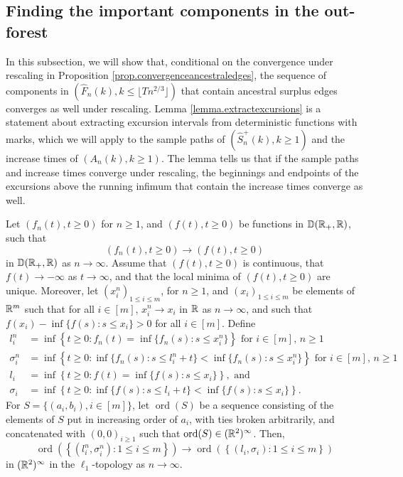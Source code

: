 \subsection{Finding the important components in the out-forest}\label{subsec.componentswithancestral}
In this subsection, we will show that, conditional on the convergence under rescaling in Proposition \ref{prop.convergenceancestraledges}, the sequence of components in $(\hat{F}_n(k),k\leq \lfloor T n^{2/3}\rfloor )$ that contain ancestral surplus edges converges as well under rescaling. Lemma \ref{lemma.extractexcursions} is a statement about extracting excursion intervals from deterministic functions with marks, which we will apply to the sample paths of $(\hat{S}_n^{+}(k),k\geq 1)$ and the increase times of $(A_n(k),k\geq 1)$. The lemma tells us that if the sample paths and increase times converge under rescaling, the beginnings and endpoints of the excursions above the running infimum that contain the increase times converge as well. 
\begin{lemma}\label{lemma.extractexcursions}
Let $(f_n(t), t\geq 0)$ for $n\geq 1$, and $(f(t),t\geq 0)$ be functions in ${\mathbb D}({\mathbb R}_+,{\mathbb R})$, such that 
$$(f_n(t), t\geq 0)\to (f(t),t\geq 0)$$ in ${\mathbb D}({\mathbb R}_+,{\mathbb R})$ as $n\to \infty$. Assume that $(f(t),t\geq 0)$ is continuous, that $f(t)\to -\infty$ as $t\to \infty$, and that the local minima of $(f(t),t\geq 0)$ are unique. Moreover, let $(x_i^n)_{1\leq i\leq m}$, for $n\geq 1$, and $(x_i)_{1\leq i\leq m}$ be elements of ${\mathbb R}^{m}$ such that for all $i\in [m]$, $x_i^n\to x_i$ in ${\mathbb R}$ as $n\to \infty$, and such that $f(x_i)-\inf\{f(s):s\leq x_i\}>0$ for all $i\in [m]$. Define
\begin{align*}l_i^n&=\inf\left\{t\geq 0:f_n(t)=\inf\{f_n(s):s\leq x_i^n\}\right\}\text{ for }i\in [m]\text{, }n\geq 1\\
\sigma_i^n&=\inf\left\{ t\geq 0: \inf\{f_n(s):s\leq l_i^n+t\} < \inf\{f_n(s):s\leq x_i^n\}\right\}\text{ for }i\in [m]\text{, }n\geq 1\\
l_i&=\inf\left\{t\geq 0:f(t)=\inf\{f(s):s\leq x_i\}\right\},\text{ and}\\
\sigma_i&=\inf\left\{ t\geq 0: \inf\{f(s):s\leq l_i+ t\} < \inf\{f(s):s\leq x_i\}\right\}.
\end{align*}
For $S=\{(a_i,b_i), i\in [m]\}$, let $\operatorname{ord}(S)$ be a sequence consisting of the elements of $S$ put in increasing order of $a_i$, with ties broken arbitrarily, and concatenated with $(0,0)_{i\geq 1}$ such that $\operatorname{ord}(S)\in ({\mathbb R}^2)^\infty$. Then, 
$$\operatorname{ord}\left(\left\{(l_i^n,\sigma_i^n):1\leq i \leq m\right\}\right)\to \operatorname{ord}\left(\left\{(l_i,\sigma_i):1\leq i \leq m\right\}\right)$$
in $({\mathbb R}^{2})^\infty$ in the $\ell_1$-topology as $n\to \infty$. 
\end{lemma}
